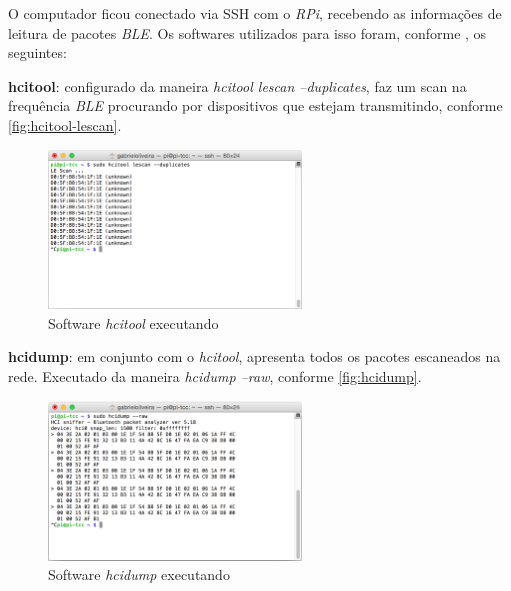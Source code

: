 O computador ficou conectado via SSH com o \textit{RPi}, recebendo as informações de leitura de pacotes \textit{BLE}. Os softwares utilizados para isso foram, conforme , os seguintes:

\begin{alineas}
	\item \textbf{hcitool}: configurado da maneira \textit{hcitool lescan --duplicates}, faz um scan na frequência \textit{BLE} procurando por dispositivos que estejam transmitindo, conforme \autoref{fig:hcitool-lescan}.
	
	\begin{figure}[htb]
		\caption{\label{fig:hcitool-lescan}Software \textit{hcitool} executando}
		\begin{center}
			\includegraphics[width=0.6\textwidth]{img/hcitool-lescan.png}
		\end{center}
	\end{figure}

	\item \textbf{hcidump}: em conjunto com o \textit{hcitool}, apresenta todos os pacotes escaneados na rede. Executado da maneira \textit{hcidump --raw}, conforme \autoref{fig:hcidump}.
	
	\begin{figure}[htb]
		\caption{\label{fig:hcidump}Software \textit{hcidump} executando}
		\begin{center}
			\includegraphics[width=0.6\textwidth]{img/hcidump.png}
		\end{center}
	\end{figure}

\end{alineas}

